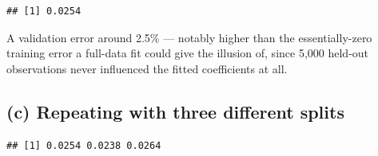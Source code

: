 \documentclass[
  11pt,
]{article}
\newenvironment{Shaded}{\begin{snugshade}}{\end{snugshade}}
\newcommand{\AttributeTok}[1]{\textcolor[rgb]{0.13,0.29,0.53}{#1}}
\newcommand{\ControlFlowTok}[1]{\textcolor[rgb]{0.13,0.29,0.53}{\textbf{#1}}}
\newcommand{\DecValTok}[1]{\textcolor[rgb]{0.00,0.00,0.81}{#1}}
\newcommand{\FloatTok}[1]{\textcolor[rgb]{0.00,0.00,0.81}{#1}}
\newcommand{\FunctionTok}[1]{\textcolor[rgb]{0.13,0.29,0.53}{\textbf{#1}}}
\newcommand{\NormalTok}[1]{#1}
\newcommand{\OtherTok}[1]{\textcolor[rgb]{0.56,0.35,0.01}{#1}}
\newcommand{\SpecialCharTok}[1]{\textcolor[rgb]{0.81,0.36,0.00}{\textbf{#1}}}
\newcommand{\StringTok}[1]{\textcolor[rgb]{0.31,0.60,0.02}{#1}}
\begin{document}
\begin{verbatim}
## [1] 0.0254
\end{verbatim}

A validation error around 2.5\% --- notably higher than the
essentially-zero training error a full-data fit could give the illusion
of, since 5,000 held-out observations never influenced the fitted
coefficients at all.

\subsection{(c) Repeating with three different
splits}\label{c-repeating-with-three-different-splits}

\begin{Shaded}
\end{Shaded}

\begin{verbatim}
## [1] 0.0254 0.0238 0.0264
\end{verbatim}
\end{document}
